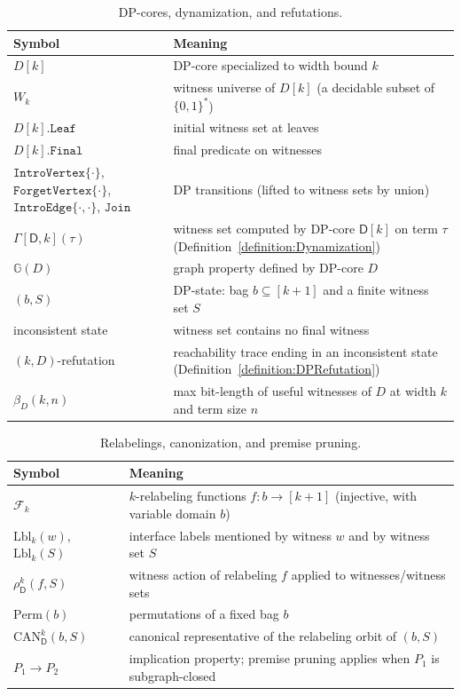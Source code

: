 \documentclass[11pt,a4paper]{article}
\newcommand{\introvertexgeneric}[1]{\mathtt{IntroVertex}\{#1\}}
\newcommand{\introedgegeneric}[2]{\mathtt{IntroEdge}\{#1,#2\}}
\newcommand{\forgetvertexgeneric}[1]{\mathtt{ForgetVertex}\{#1\}}
\newcommand{\initialsetgeneric}{\mathtt{Leaf}}
\newcommand{\joingenericcore}{\mathtt{Join}}
\newcommand{\finalwitnessgenericcore}{\mathtt{Final}}
\newcommand{\dpcoregraphproperty}[1]{\mathbb{G}(#1)}
\newcommand{\dpcore}{\mathsf{D}}
\newcommand{\dynamizationfunctionname}[1]{\Gamma[{#1}]}
\newcommand{\dynamizationfunction}[2]{\dynamizationfunctionname{#1,#2}}
\newcommand{\relabelclass}{\mathcal{F}}
\newcommand{\action}{\rho}
\newcommand{\canonic}{\mathrm{CAN}}
\begin{document}
\begin{table}[H]
\centering
\footnotesize
\begin{tabularx}{\textwidth}{@{}lX@{}}
\hline
\textbf{Symbol} & \textbf{Meaning} \\
\hline
$D[k]$ & DP-core specialized to width bound $k$ \\
$W_k$ & witness universe of $D[k]$ (a decidable subset of $\{0,1\}^\ast$) \\
$D[k].\initialsetgeneric$ & initial witness set at leaves \\
$D[k].\finalwitnessgenericcore$ & final predicate on witnesses \\
$\introvertexgeneric{\cdot}$, $\forgetvertexgeneric{\cdot}$, $\introedgegeneric{\cdot}{\cdot}$, $\joingenericcore$ & DP transitions (lifted to witness sets by union) \\
$\dynamizationfunction{\dpcore}{k}(\tau)$ & witness set computed by DP-core $\dpcore[k]$ on term $\tau$ (Definition~\ref{definition:Dynamization}) \\
$\dpcoregraphproperty{D}$ & graph property defined by DP-core $D$ \\
$(b,S)$ & DP-state: bag $b\subseteq[k+1]$ and a finite witness set $S$ \\
inconsistent state & witness set contains no final witness \\
$(k,D)$-refutation & reachability trace ending in an inconsistent state (Definition~\ref{definition:DPRefutation}) \\
$\beta_D(k,n)$ & max bit-length of useful witnesses of $D$ at width $k$ and term size $n$ \\
\hline
\end{tabularx}
\caption{DP-cores, dynamization, and refutations.}
\label{table:notation-dpcores}
\end{table}

\begin{table}[H]
\centering
\footnotesize
\begin{tabularx}{\textwidth}{@{}lX@{}}
\hline
\textbf{Symbol} & \textbf{Meaning} \\
\hline
$\relabelclass_k$ & $k$-relabeling functions $f:b\to[k+1]$ (injective, with variable domain $b$) \\
$\mathrm{Lbl}_k(w)$, $\mathrm{Lbl}_k(S)$ & interface labels mentioned by witness $w$ and by witness set $S$ \\
$\action_{\dpcore}^{k}(f,S)$ & witness action of relabeling $f$ applied to witnesses/witness sets \\
$\mathrm{Perm}(b)$ & permutations of a fixed bag $b$ \\
$\canonic_{\dpcore}^{k}(b,S)$ & canonical representative of the relabeling orbit of $(b,S)$ \\
$P_1\to P_2$ & implication property; premise pruning applies when $P_1$ is subgraph-closed \\
\hline
\end{tabularx}
\caption{Relabelings, canonization, and premise pruning.}
\label{table:notation-canonization}
\end{table}
\end{document}
